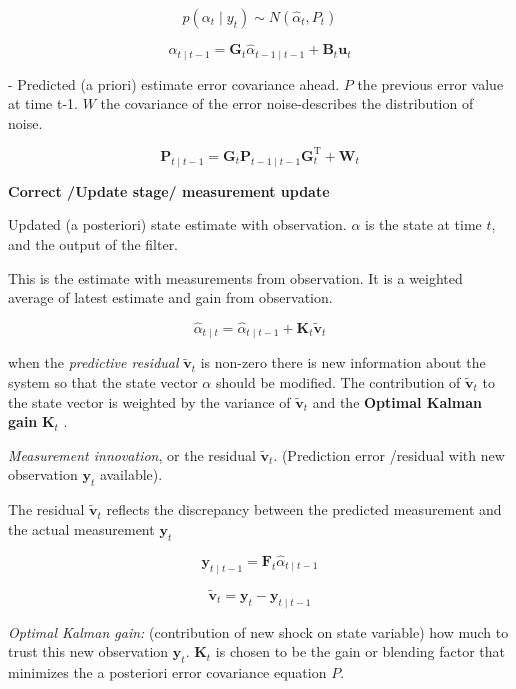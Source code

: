 $$p(\alpha_t \mid y_t) \sim N( \hat \alpha_t, P_t)$$ 



$$\hat{\alpha}_{t\mid t-1} = \mathbf{G}_{t}\hat{\alpha}_{t-1\mid t-1} + \mathbf{B}_{t} \mathbf{u}_{t} $$

- Predicted (a priori) estimate error covariance ahead. $P$ the previous error value at time t-1. $W$ the covariance of the error noise-describes the distribution of noise.

$$\mathbf{P}_{t\mid t-1} = \mathbf{G}_{t} \mathbf{P}_{t-1\mid t-1} \mathbf{G}_{t}^\text{T} + \mathbf{W}_{t}$$


\textbf{Correct /Update stage/  measurement update}

Updated (a posteriori) state estimate with observation. $\alpha$ is the state at time $t$, and the output of the filter.   

This is the estimate with measurements from observation. It is a weighted average of latest estimate and gain from observation. 



$$\hat{\alpha}_{t\mid t} = \hat{\alpha}_{t\mid t-1} + \mathbf{K}_t \tilde{\mathbf{v}}_t$$



when the \textit{predictive residual}  $\tilde{\mathbf{v}}_t$  is non-zero there is new information about the system so
that the state vector $\alpha$ should be modified. The contribution of $\tilde{\mathbf{v}}_t$ to the state vector is weighted by the variance of  $\tilde{\mathbf{v}}_t$ and the \textbf{Optimal Kalman gain} $\mathbf{K}_t$ .

\textit{Measurement innovation}, or the residual $\tilde{\mathbf{v}}_t$. (Prediction error /residual with new observation $\mathbf{y}_t$ available).  

The residual $\tilde{\mathbf{v}}_t$ reflects the discrepancy between the predicted measurement and the actual measurement $\mathbf{y}_t$

$$ \mathbf{y}_{t\mid t-1}  = \mathbf{F}_t\hat{\alpha}_{t\mid t-1} $$

$$\tilde{\mathbf{v}}_t = \mathbf{y}_t -\mathbf{y}_{t\mid t-1} $$




\textit{Optimal Kalman gain:} (contribution of new shock on state variable)  how much to trust this new observation $\mathbf{y}_t$.  $\mathbf{K}_t$ is chosen to be the gain or blending factor that minimizes the a posteriori error covariance equation $P$.



